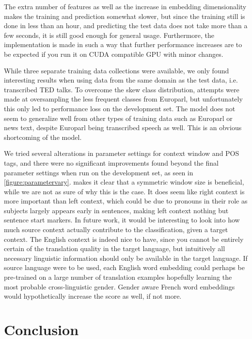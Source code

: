 \documentclass[11pt]{article}
\begin{document}
The extra number of features as well as the increase in embedding dimensionality makes the training and prediction somewhat slower, but since the training still is done in less than an hour, and predicting the test data does not take more than a few seconds, it is still good enough for general usage.
Furthermore, the implementation is made in such a way that further performance increases are to be expected if you run it on CUDA compatible GPU with minor changes.

While three separate training data collections were available, we only found interesting results when using data from the same domain as the test data, i.e. transcribed TED talks.
To overcome the skew class distribution, attempts were made at oversampling the less frequent classes from Europarl, but unfortunately this only led to performance loss on the development set.
The model does not seem to generalize well from other types of training data such as Europarl or news text, despite Europarl being transcribed speech as well.
This is an obvious shortcoming of the model.

We tried several alterations in parameter settings for context window and POS tags, and there were no significant improvements found beyond the final parameter settings when run on the development set, as seen in \cref{figure:parametervary}.
 makes it clear that a symmetric window size is beneficial, while we are not as sure of why this is the case.
It does seem like right context is more important than left context, which could be due to pronouns in their role as subjects largely appears early in sentences, making left context nothing but sentence start markers.
In future work, it would be interesting to look into how much source context actually contribute to the classification, given a target context.
The English context is indeed nice to have, since you cannot be entirely certain of the translation quality in the target language, but intuitively all necessary linguistic information should only be available in the target language.
If source language were to be used, each English word embedding could perhaps be pre-trained on a large number of translation examples hopefully learning the most probable cross-linguistic gender.
Gender aware French word embeddings would hypothetically increase the score as well, if not more.

\section{Conclusion}
\end{document}
